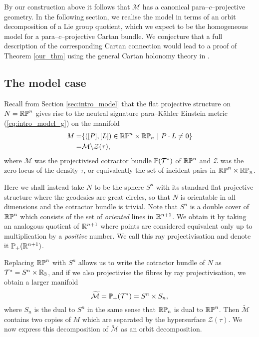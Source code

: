By our construction above it follows that $\mathcal{M}$ has a canonical para--$c$--projective geometry. In the following section, we realise the model in terms of an orbit decomposition of a Lie group quotient, which we expect to be the homogeneous model for a para--$c$--projective Cartan bundle. We conjecture that a full description of the corresponding Cartan connection would lead to a proof of Theorem \ref{our_thm} using the general Cartan holonomy theory in \cite{CGH-duke}.


\subsection{The model case}

Recall from Section \ref{sec:intro_model} that the flat projective structure on $N=\mathbb{RP}^n$ gives rise to 
the neutral signature para--K\"ahler Einstein metric (\ref{eq:intro_model_g}) on the manifold
\begin{align*}
M=&\{([P],[L])\in\mathbb{RP}^n\times\mathbb{RP}_n\ |\ P\cdot L\neq 0\} \\
=& \mathcal{M}\backslash\mathcal{Z}(\tau),
\end{align*}
where $\mathcal{M}$ was the projectivised cotractor bundle $\mathbb{P}(\mathcal{T}^*)$ of $\mathbb{RP}^n$ and $\mathcal{Z}$ was the zero locus of the density $\tau$, or equivalently the set of incident pairs in $\mathbb{RP}^n\times\mathbb{RP}_n$.

Here we shall instead take $N$ to be the sphere $S^n$ with its standard flat projective structure where the geodesics are great circles, so that $N$ is orientable in all dimensions and the cotractor bundle is trivial. Note that $S^n$ is a double cover of $\mathbb{RP}^n$ which consists of the set of \textit{oriented} lines in $\mathbb{R}^{n+1}$. We obtain it by taking an analogous quotient of $\mathbb{R}^{n+1}$ where points are considered equivalent only up to multiplication by a \textit{positive} number. We call this ray projectivisation and denote it $\mathbb{P}_+(\mathbb{R}^{n+1})$.

Replacing $\mathbb{RP}^n$ with $S^n$ allows us to write the cotractor bundle of $N$ as $\mathcal{T}^*=S^n\times\mathbb{R}_3$, and if we also projectivise the fibres by ray projectivisation, we obtain a larger manifold
\[
\widetilde{\mathcal{M}}=\mathbb{P}_+(\mathcal{T}^*)=S^n\times S_n,
\]
where $S_n$ is the dual to $S^n$ in the same sense that $\mathbb{RP}_n$ is dual to $\mathbb{RP}^n$. Then $\widetilde{\mathcal{M}}$ contains two copies of $M$ which are separated by the hypersurface $\mathcal{Z}(\tau)$. We now express this decomposition of $\widetilde{\mathcal{M}}$ as an orbit decomposition.

